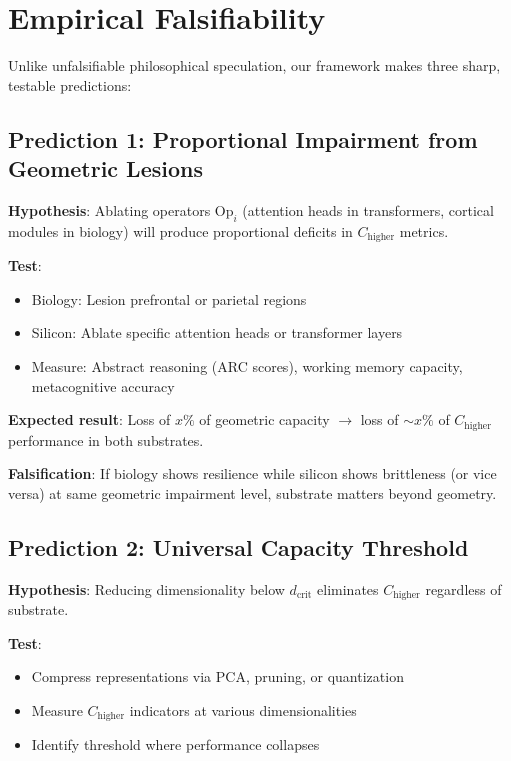\documentclass[11pt]{article}
\begin{document}
\section{Empirical Falsifiability}

Unlike unfalsifiable philosophical speculation, our framework makes three sharp, testable predictions:

\subsection{Prediction 1: Proportional Impairment from Geometric Lesions}

\textbf{Hypothesis}: Ablating operators $\text{Op}_i$ (attention heads in transformers, cortical modules in biology) will produce proportional deficits in $C_{\text{higher}}$ metrics.

\textbf{Test}:
\begin{itemize}
\item Biology: Lesion prefrontal or parietal regions
\item Silicon: Ablate specific attention heads or transformer layers
\item Measure: Abstract reasoning (ARC scores), working memory capacity, metacognitive accuracy
\end{itemize}

\textbf{Expected result}: Loss of $x\%$ of geometric capacity $\to$ loss of $\sim x\%$ of $C_{\text{higher}}$ performance in both substrates.

\textbf{Falsification}: If biology shows resilience while silicon shows brittleness (or vice versa) at same geometric impairment level, substrate matters beyond geometry.

\subsection{Prediction 2: Universal Capacity Threshold}

\textbf{Hypothesis}: Reducing dimensionality below $d_{\text{crit}}$ eliminates $C_{\text{higher}}$ regardless of substrate.

\textbf{Test}:
\begin{itemize}
\item Compress representations via PCA, pruning, or quantization
\item Measure $C_{\text{higher}}$ indicators at various dimensionalities
\item Identify threshold where performance collapses
\end{itemize}
\end{document}
